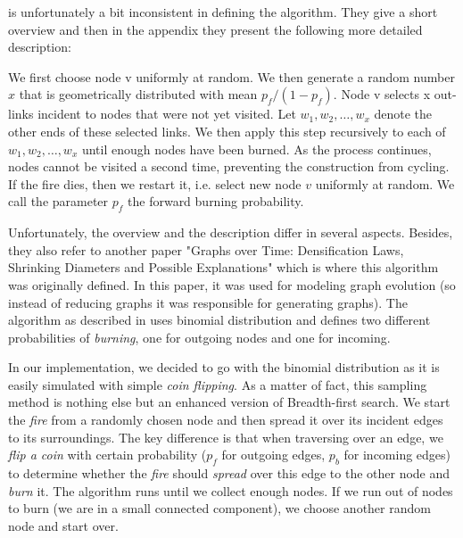 \cite{leskovec2006sampling} is unfortunately a bit inconsistent in defining the algorithm. They give a short overview and then in the appendix they
present the following more detailed description:

\begin{displayquote}
We first choose node v uniformly at random. We then generate a random number $x$ that is geometrically distributed with mean $p_f/(1-p_f)$. Node v selects x out-links incident to nodes that were not yet visited. Let $w_1 , w_2 , \ldots, w_x$ denote the other ends of these selected links. We then apply this step recursively to each of $w_1, w_2, \ldots, w_x$ until enough nodes have been burned. As the process continues, nodes cannot be visited a second time, preventing the construction from cycling. If the fire dies, then we restart it, i.e. select new node $v$ uniformly at random. We call the parameter $p_f$ the forward burning probability.
\end{displayquote}

Unfortunately, the overview and the description differ in several aspects. Besides, they also refer to another paper "Graphs over Time: Densification Laws, Shrinking Diameters and Possible Explanations" \cite{leskovec2005graphs} which is where this algorithm was originally defined. In this paper, it was used for modeling graph evolution (so instead of reducing graphs it was responsible for generating graphs). The algorithm as described in \cite{leskovec2005graphs} uses binomial distribution and defines two different probabilities of \emph{burning}, one for outgoing nodes and one for incoming.

In our implementation, we decided to go with the binomial distribution as it is easily simulated with simple \emph{coin flipping}. As a matter of fact, this sampling method is nothing else but an enhanced version of Breadth-first search. We start the \emph{fire} from a randomly chosen node and then spread it over its incident edges to its surroundings. The key difference is that when traversing over an edge, we \emph{flip a coin} with certain probability ($p_f$ for outgoing edges, $p_b$ for incoming edges) to determine whether the \emph{fire} should \emph{spread} over this edge to the other node and \emph{burn} it. The algorithm runs until we collect enough nodes. If we run out of nodes to burn (we are in a small connected component), we choose another random node and start over.

